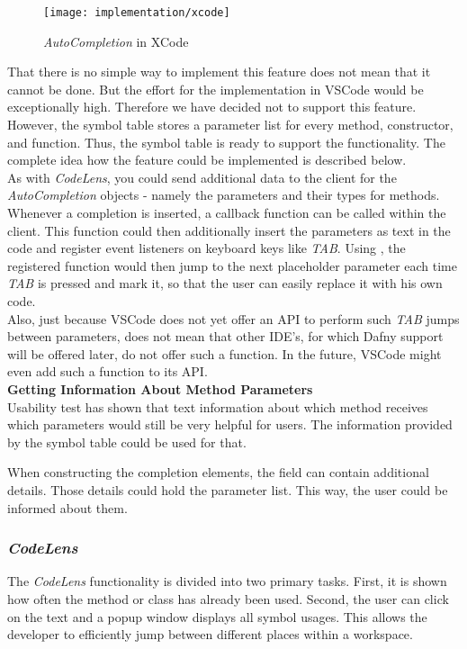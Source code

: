 \begin{figure}[H]
    \centering
    \texttt{[image: implementation/xcode]}
    \caption{\textit{AutoCompletion} in XCode}
    \label{fig:xcode_completion}
\end{figure}

That there is no simple way to implement this feature does not mean that it cannot be done.
But the effort for the implementation in VSCode would be exceptionally high.
Therefore we have decided not to support this feature.
However, the symbol table stores a parameter list for every method, constructor, and function.
Thus, the symbol table is ready to support the functionality.
The complete idea how the feature could be implemented is described below. \\

As with \textit{CodeLens}, you could send additional data to the client
for the \textit{AutoCompletion} objects - namely the parameters and their types for methods.
Whenever a completion is inserted, a callback function can be called within the client.
This function could then additionally insert the parameters as text in the code and register
event listeners on keyboard keys like \textit{TAB}.
Using , the registered function would then jump to the next placeholder parameter
each time \textit{TAB} is pressed and mark it, so that the user can easily replace it with his own code. \\

Also, just because VSCode does not yet offer an API to perform such \textit{TAB} jumps between parameters,
does not mean that other IDE's, for which Dafny support will be offered later,
do not offer such a function.
In the future, VSCode might even add such a function to its API. \\

\textbf{Getting Information About Method Parameters} \\
Usability test has shown that text information about which method
receives which parameters would still be very helpful for users.
The information provided by the symbol table could be used for that.

When constructing the completion elements,
the field  can contain additional details.
Those details could hold the parameter list.
This way, the user could be informed about them.\\


\subsubsection{\textit{CodeLens}}
\label{section:implementation:features:codelens}
The \textit{CodeLens} functionality is divided into two primary tasks.
First, it is shown how often the method or class has already been used.
Second, the user can click on the text and a popup window displays all symbol usages.
This allows the developer to efficiently jump between different places within a workspace.\\

